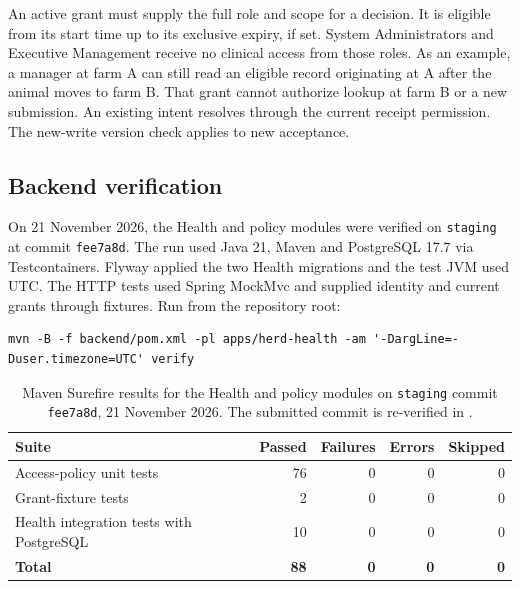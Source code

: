 An active grant must supply the full role and scope for a decision. It
is eligible from its start time up to its exclusive expiry, if set.
System Administrators and Executive Management receive no clinical
access from those roles. As an example, a manager at farm A can still
read an eligible record originating at A after the animal moves to farm
B. That grant cannot authorize lookup at farm B or a new submission.
An existing intent resolves through the current receipt permission.
The new-write version check applies to new acceptance.

\subsection{Backend verification}\label{sec:m2-health-results}

On 21 November 2026, the Health and policy modules were verified on
\texttt{staging} at commit \texttt{fee7a8d}.\cite{m2HealthStaging}
The run used Java 21, Maven and PostgreSQL 17.7 via Testcontainers.
Flyway applied the two Health migrations and the test JVM used UTC.
The HTTP tests used Spring MockMvc and supplied identity and current
grants through fixtures. Run from the repository root:

\begin{lstlisting}[basicstyle=\footnotesize\ttfamily,breaklines=true,columns=fullflexible]
mvn -B -f backend/pom.xml -pl apps/herd-health -am '-DargLine=-Duser.timezone=UTC' verify
\end{lstlisting}

\begin{table}[H]
\centering
\small
\begin{tabularx}{\linewidth}{@{}Xrrrr@{}}
\toprule
\textbf{Suite} & \textbf{Passed} & \textbf{Failures} &
  \textbf{Errors} & \textbf{Skipped} \\
\midrule
Access-policy unit tests & 76 & 0 & 0 & 0 \\
Grant-fixture tests & 2 & 0 & 0 & 0 \\
Health integration tests with PostgreSQL & 10 & 0 & 0 & 0 \\
\midrule
\textbf{Total} & \textbf{88} & \textbf{0} & \textbf{0} & \textbf{0} \\
\bottomrule
\end{tabularx}
\caption{Maven Surefire results for the Health and policy modules on \texttt{staging} commit \texttt{fee7a8d}, 21 November 2026. The submitted commit is re-verified in .}
\label{tab:m2-health-tests}
\end{table}

